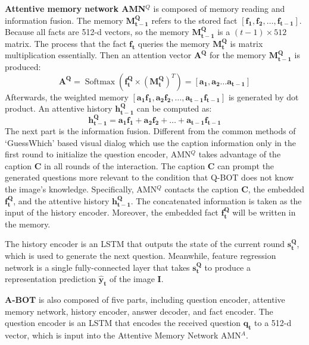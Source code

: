 \documentclass[review]{elsarticle}
\begin{document}
	\textbf{Attentive memory network AMN$^{Q}$} is composed of memory reading and information fusion. The memory $\mathbf{M^{Q}_{t-1}}$  refers to the stored fact $\left[\mathbf{f_{1}}, \mathbf{f_{2}}, \dots, \mathbf{f_{t-1}} \right]$. Because all facts are 512-d vectors, so the memory $\mathbf{M^{Q}_{t-1}}$ is a $(t-1) \times 512$ matrix. 
	The process that the fact $\mathbf{f_{t}}$ queries the memory $\mathbf{M^{Q}_{t}}$ is matrix multiplication essentially. Then an attention vector $\mathbf{A^{Q}}$ for the memory $\mathbf{M^{Q}_{t-1}}$ is produced:
	\begin{equation}
	\mathbf{A^{Q}}=\operatorname{Softmax}\left(\mathbf{f_{t}^{Q}} \times\left(\mathbf{M_{t}^{Q}}\right)^{T}\right)=\left[\mathbf{a_{1}}, \mathbf{a_{2}} \dots \mathbf{a_{t-1}}\right]
	\label{Eq1}
	\end{equation}
	Afterwards, the weighted memory $\left[\mathbf{a_{1}f_{1}}, \mathbf{a_{2}f_{2}}, \dots, \mathbf{a_{t-1}f_{t-1}} \right]$ is generated by dot product. An attentive history $\mathbf{h^{Q}_{t-1}}$ can be computed as:
	\begin{equation}
	\mathbf{h_{t-1}^{Q}}=\mathbf{a_{1} f_{1}}+\mathbf{a_{2} f_{2}}+\ldots+\mathbf{a_{t-1} f_{t-1}}
	\label{Eq2}
	\end{equation}
	The next part is the information fusion. Different from the common methods of `GuessWhich' based visual dialog which use the caption information only in the first round to initialize the question encoder, AMN$^{Q}$ takes advantage of the caption $\textbf{C}$ in all rounds of the interaction.
	The caption $\textbf{C}$ can prompt the generated questions more relevant to the condition that Q-BOT does not know the image's knowledge. Specifically, AMN$^{Q}$ contacts the caption $\textbf{C}$, the embedded $\mathbf{f^{Q}_{t}}$, and the attentive history $\mathbf{h^{Q}_{t-1}}$. 
	The concatenated information is taken as the input of the history encoder. Moreover, the embedded fact $\mathbf{f^{Q}_{t}}$ will be written in the memory.
	
	The history encoder is an LSTM that outputs the state of the current round $\mathbf{s^{Q}_{t}}$, which is used to generate the next question. Meanwhile, feature regression network is a single fully-connected layer that takes $\mathbf{s^{Q}_{t}}$ to produce a representation prediction $\mathbf{\hat{y}_{t}}$ of the image $\textbf{I}$.
	
	\textbf{A-BOT} is also composed of five parts, including question encoder, attentive memory network, history encoder, answer decoder, and fact encoder. 
	The question encoder is an LSTM that encodes the received question $\mathbf{q_{t}}$ to a 512-d vector, which is input into the Attentive Memory Network AMN$^{A}$.
	
\end{document}
